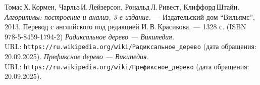 \begin{thebibliography}{99}
Томас\,Х.\,Кормен, Чарльз\,И.\,Лейзерсон, Рональд\,Л.\,Ривест, Клиффорд\,Штайн.
{\itshape Алгоритмы: построение и анализ, 3-е издание.} --- Издательский дом \enquote{Вильямс}, 2013. Перевод с английского под редакцией И.\,В.\,Красикова. --- 1328 с. (ISBN 978-5-8459-1794-2)
{\itshape Радиксальное дерево — Википедия.} \\URL: \texttt{https://ru.wikipedia.org/wiki/Радиксальное\_дерево} (дата обращения: 20.09.2025).
{\itshape Префиксное дерево — Википедия.} \\URL: \texttt{https://ru.wikipedia.org/wiki/Префиксное\_дерево} (дата обращения: 20.09.2025).
\end{thebibliography}
\pagebreak